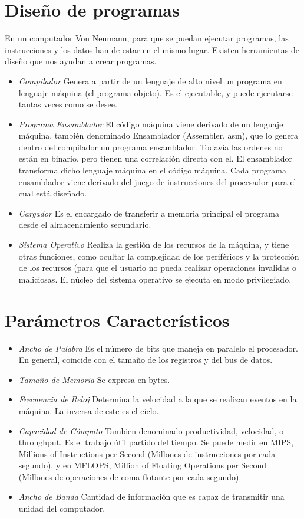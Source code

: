 \documentclass[a4paper,11pt,spanish]{report}
\begin{document}
\section{Diseño de programas}
En un computador Von Neumann, para que se puedan ejecutar programas, las instrucciones y los datos han de estar en el mismo lugar. Existen herramientas de diseño que nos ayudan a crear programas.
\begin{itemize}
\item \emph{Compilador} Genera a partir de un lenguaje de alto nivel un programa en lenguaje máquina (el programa objeto). Es el ejecutable, y puede ejecutarse tantas veces como se desee.
\item \emph{Programa Ensamblador} El código máquina viene derivado de un lenguaje máquina, también denominado Ensamblador (Assembler, asm), que lo genera dentro del compilador un programa ensamblador. Todavía las ordenes no están en binario, pero tienen una correlación directa con el. El ensamblador transforma dicho lenguaje máquina en el código máquina. Cada programa ensamblador viene derivado del juego de instrucciones del procesador para el cual está diseñado.
\item \emph{Cargador} Es el encargado de transferir a memoria principal el programa desde el almacenamiento secundario.
\item \emph{Sistema Operativo} Realiza la gestión de los recursos de la máquina, y tiene otras funciones, como ocultar la complejidad de los periféricos y la protección de los recursos (para que el usuario no pueda realizar operaciones invalidas o maliciosas. El núcleo del sistema operativo se ejecuta en modo privilegiado.
\end{itemize}

\section{Parámetros Característicos}
\begin{itemize}
\item \emph{Ancho de Palabra} Es el número de bits que maneja en paralelo el procesador. En general, coincide con el tamaño de los registros y del bus de datos.
\item \emph{Tamaño de Memoria} Se expresa en bytes.
\item \emph{Frecuencia de Reloj} Determina la velocidad a la que se realizan eventos en la máquina. La inversa de este es el ciclo.
\item \emph{Capacidad de Cómputo} Tambien denominado productividad, velocidad, o throughput. Es el trabajo útil partido del tiempo. Se puede medir en MIPS, Millions of Instructions per Second (Millones de instrucciones por cada segundo), y en MFLOPS, Million of Floating Operations per Second (Millones de operaciones de coma flotante por cada segundo).
\item \emph{Ancho de Banda} Cantidad de información que es capaz de transmitir una unidad del computador.
\end{itemize}
\end{document}
